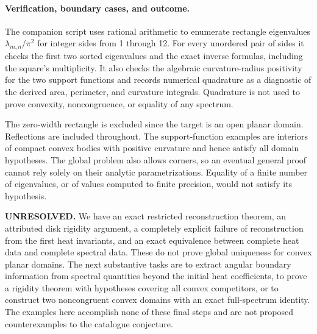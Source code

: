 \documentclass[11pt]{article}
\begin{document}
\paragraph{Verification, boundary cases, and outcome.}
The companion script uses rational arithmetic to enumerate rectangle
eigenvalues $\lambda_{m,n}/\pi^2$ for integer sides from 1 through 12.
For every unordered pair of sides it checks the first two sorted eigenvalues
and the exact inverse formulas, including the square's multiplicity.
It also checks the algebraic curvature-radius positivity for the two support
functions and records numerical quadrature as a diagnostic of the derived
area, perimeter, and curvature integrals. Quadrature is not used to prove
convexity, noncongruence, or equality of any spectrum.

The zero-width rectangle is excluded since the target is an open planar
domain. Reflections are included throughout. The support-function examples
are interiors of compact convex bodies with positive curvature and hence
satisfy all domain hypotheses. The global problem also allows corners,
so an eventual general proof cannot rely solely on their analytic
parametrizations. Equality of a finite number of eigenvalues, or of values
computed to finite precision, would not satisfy its hypothesis.

\textbf{UNRESOLVED.} We have an exact restricted reconstruction theorem,
an attributed disk rigidity argument, a completely explicit failure of
reconstruction from the first heat invariants, and an exact equivalence
between complete heat data and complete spectral data. These do not prove
global uniqueness for convex planar domains. The next substantive tasks are
to extract angular boundary information from spectral quantities beyond the
initial heat coefficients, to prove a rigidity theorem with hypotheses
covering all convex competitors, or to construct two noncongruent convex
domains with an exact full-spectrum identity. The examples here accomplish
none of these final steps and are not proposed counterexamples to the
catalogue conjecture.
\end{document}
